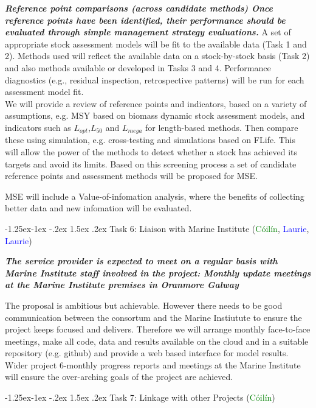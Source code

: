 \documentclass[a4paper, 10pt]{article}
\makeatletter
\newcommand{\laurie}{\textcolor{blue}}
\newcommand{\coilin}{\textcolor{green}}
\renewcommand{\subsubsection}{\@startsection{subsubsection}{3}{\z@}%
  {-1.25ex\@plus -1ex \@minus -.2ex}%
  {1.5ex \@plus .2ex}%
  {\normalfont\slshape}}
\makeatother
\begin{document}
\textit{\textbf{Reference point comparisons (across candidate methods) Once reference points have been identified, their performance should be evaluated through simple management strategy evaluations.}}
A set of appropriate stock assessment models will be fit to the available data (Task 1 and 2). Methods used will reflect the available data on a stock-by-stock basis (Task 2) and also methods available or developed in Tasks 3 and 4. Performance diagnostics (e.g., residual inspection, retrospective patterns) will be run for each assessment model fit.\\
We will provide a review of reference points and indicators, based on a variety of assumptions, e.g. MSY based on biomass dynamic stock assessment models, and indicators such as $L_{opt}$,$L_{50}$ and $L_{mega}$ for length-based methods. Then compare these using simulation, e.g. cross-testing and simulations based on FLife. This will allow the power of the methods to detect whether a stock has achieved its targets and avoid its limits. Based on this screening process a set of candidate reference points and assessment methods will be proposed for MSE.

MSE will include a Value-of-infomation analysis, where the benefits of collecting better data and new infomation will be evaluated.

\subsubsection{Task 6: Liaison with Marine Institute (\coilin{C\'oil\'in}, \laurie{Laurie}, \laurie{Laurie})}

\textit{\textbf{The service provider is expected to meet on a regular basis with Marine Institute staff involved in the project:  Monthly update meetings at the Marine Institute premises in Oranmore Galway}}

The proposal is ambitious but achievable. However there needs to be good communication between the consortum and the Marine Instiutute to ensure the project keeps focused and delivers. Therefore we will arrange monthly face-to-face meetings, make all code, data and results available on the cloud and in a suitable repository (e.g. github) and provide a web based interface for model results.\\
Wider project 6-monthly progress reports and meetings at the Marine Institute will ensure the over-arching goals of the project are achieved.

\subsubsection{Task 7:  Linkage with other Projects (\coilin{C\'oil\'in})}
\end{document}
